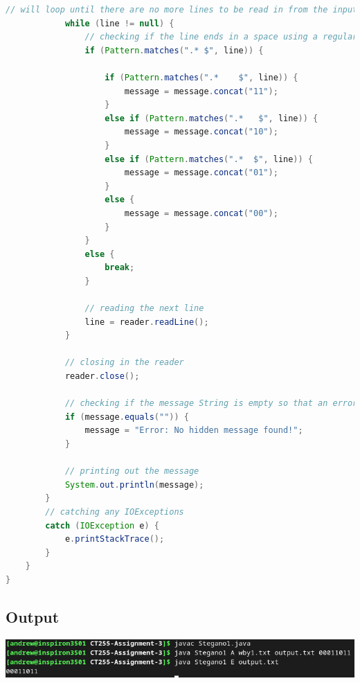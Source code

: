 \documentclass[a4paper]{article}
\begin{document}
\begin{lstlisting}[language=java]
            // will loop until there are no more lines to be read in from the input file
            while (line != null) {
                // checking if the line ends in a space using a regular expression
                if (Pattern.matches(".* $", line)) {                            // (checking if the String line contains any amount of any characters, followed by a space followed by the end of a line)

                    if (Pattern.matches(".*    $", line)) {                     // checking if the line ends in four spaces using a regular expression
                        message = message.concat("11");                         // concatenating "11" onto the end of the message String (four spaces represents "11")
                    }
                    else if (Pattern.matches(".*   $", line)) {                 // checking if the line ends in three spaces using a regular expression
                        message = message.concat("10");                         // concatenating "10" onto the end of the message String (three spaces represents "10")
                    }
                    else if (Pattern.matches(".*  $", line)) {                  // (checking if the String line contains any amount of any characters, followed by two spaces followed by the end of a line)
                        message = message.concat("01");                         // concatenating a "1" onto the message String (two spaces represent a "1")
                    }
                    else {                                                      // essentially, this "else" means "if the line ends with one space but not two"
                        message = message.concat("00");                         // concatenating a "0" onto the message String (one space represents a "0")
                    }
                }
                else {                                                          // if the String does not end in a space, then there is no (more) message to read
                    break;
                }
                
                // reading the next line
	        	line = reader.readLine();
            }

            // closing in the reader
            reader.close();

            // checking if the message String is empty so that an error message can be printed if no hidden message was found
            if (message.equals("")) {
                message = "Error: No hidden message found!";
            }

            // printing out the message
            System.out.println(message);
	    } 
        // catching any IOExceptions
        catch (IOException e) {
	        e.printStackTrace();
	    }
    }
}
\end{lstlisting}
\subsection{Output}
\includegraphics[width = 15cm]{output2.png}
\end{document}

